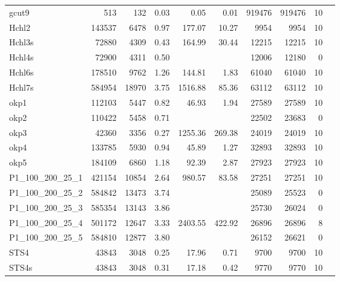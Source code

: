 \documentclass[runningheads]{llncs}
\begin{document}
\begin{table}
\begin{tabular}{@{\extracolsep{2pt}}lrrrrrrrrr@{}}
gcut9 & 513 & 132 & 0.03 & 0.05 & 0.01 & 919476 & 919476 & 10 \\
Hchl2 & 143537 & 6478 & 0.97 & 177.07 & 10.27 & 9954 & 9954 & 10 \\
Hchl3s & 72880 & 4309 & 0.43 & 164.99 & 30.44 & 12215 & 12215 & 10 \\
Hchl4s & 72900 & 4311 & 0.50 &  &  & 12006 & 12180 & 0 \\
Hchl6s & 178510 & 9762 & 1.26 & 144.81 & 1.83 & 61040 & 61040 & 10 \\
Hchl7s & 584954 & 18970 & 3.75 & 1516.88 & 85.36 & 63112 & 63112 & 10 \\
okp1 & 112103 & 5447 & 0.82 & 46.93 & 1.94 & 27589 & 27589 & 10 \\
okp2 & 110422 & 5458 & 0.71 &  &  & 22502 & 23683 & 0 \\
okp3 & 42360 & 3356 & 0.27 & 1255.36 & 269.38 & 24019 & 24019 & 10 \\
okp4 & 133785 & 5930 & 0.94 & 45.89 & 1.27 & 32893 & 32893 & 10 \\
okp5 & 184109 & 6860 & 1.18 & 92.39 & 2.87 & 27923 & 27923 & 10 \\
P1\_100\_200\_25\_1 & 421154 & 10854 & 2.64 & 980.57 & 83.58 & 27251 & 27251 & 10 \\
P1\_100\_200\_25\_2 & 584842 & 13473 & 3.74 &  &  & 25089 & 25523 & 0 \\
P1\_100\_200\_25\_3 & 585354 & 13143 & 3.86 &  &  & 25730 & 26024 & 0 \\
P1\_100\_200\_25\_4 & 501172 & 12647 & 3.33 & 2403.55 & 422.92 & 26896 & 26896 & 8 \\
P1\_100\_200\_25\_5 & 584810 & 12877 & 3.80 &  &  & 26152 & 26621 & 0 \\
STS4 & 43843 & 3048 & 0.25 & 17.96 & 0.71 & 9700 & 9700 & 10 \\
STS4s & 43843 & 3048 & 0.31 & 17.18 & 0.42 & 9770 & 9770 & 10 \\
\hline
\end{tabular}
\label{tab:appendix}
\end{table}
\end{document}
